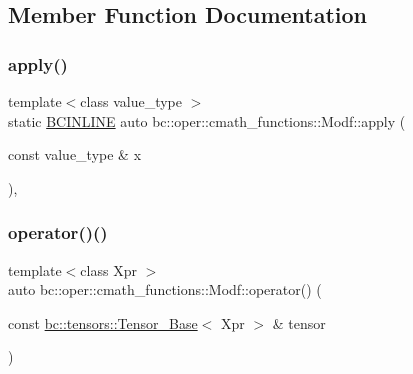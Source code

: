 \subsection{Member Function Documentation}
\mbox{\label{structbc_1_1oper_1_1cmath__functions_1_1Modf_a8ad5783eb4bbf2ef0cb6327bc7b8ec75}} 
\subsubsection{\texorpdfstring{apply()}{apply()}}
{\footnotesize\ttfamily template$<$class value\+\_\+type $>$ \\
static \hyperlink{common_8h_a6699e8b0449da5c0fafb878e59c1d4b1}{B\+C\+I\+N\+L\+I\+NE} auto bc\+::oper\+::cmath\+\_\+functions\+::\+Modf\+::apply (\begin{DoxyParamCaption}\item[{const value\+\_\+type \&}]{x }\end{DoxyParamCaption})\hspace{0.3cm}{\ttfamily [inline]}, {\ttfamily [static]}}

\mbox{\label{structbc_1_1oper_1_1cmath__functions_1_1Modf_ac8b6f349be7ae4ceff903de832cc59aa}} 
\subsubsection{\texorpdfstring{operator()()}{operator()()}\hspace{0.1cm}{\footnotesize\ttfamily [1/3]}}
{\footnotesize\ttfamily template$<$class Xpr $>$ \\
auto bc\+::oper\+::cmath\+\_\+functions\+::\+Modf\+::operator() (\begin{DoxyParamCaption}\item[{const \hyperlink{classbc_1_1tensors_1_1Tensor__Base}{bc\+::tensors\+::\+Tensor\+\_\+\+Base}$<$ Xpr $>$ \&}]{tensor }\end{DoxyParamCaption})\hspace{0.3cm}{\ttfamily [inline]}}

